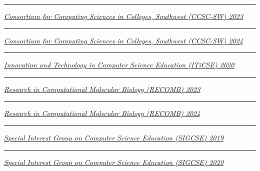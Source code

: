 \documentclass[margin,line]{res}
\begin{document}
\begin{resume}
\rule{-1mm}{5mm} \hspace*{4mm} \href{http://www.ccsc.org/southwestern/2023/index.php}{\textit{Consortium for Computing Sciences in Colleges, Southwest (CCSC-SW) 2023}}\\
\rule{-1mm}{5mm} \hspace*{4mm} \href{http://www.ccsc.org/southwestern/2024/index.php}{\textit{Consortium for Computing Sciences in Colleges, Southwest (CCSC-SW) 2024}}\\
\rule{-1mm}{5mm} \hspace*{4mm} \href{https://iticse.acm.org/}{\textit{Innovation and Technology in Computer Science Education (ITiCSE) 2020}}\\
\rule{-1mm}{5mm} \hspace*{4mm} \href{https://recomb.org/recomb2023/}{\textit{Research in Computational Molecular Biology (RECOMB) 2023}}\\
\rule{-1mm}{5mm} \hspace*{4mm} \href{https://recomb.org/recomb2024/}{\textit{Research in Computational Molecular Biology (RECOMB) 2024}}\\
\rule{-1mm}{5mm} \hspace*{4mm} \href{https://sigcse2019.sigcse.org/}{\textit{Special Interest Group on Computer Science Education (SIGCSE) 2019}}\\
\rule{-1mm}{5mm} \hspace*{4mm} \href{https://sigcse2020.sigcse.org/}{\textit{Special Interest Group on Computer Science Education (SIGCSE) 2020}}\\


\end{resume}
\end{document}
